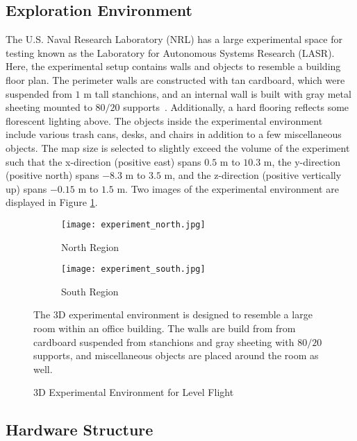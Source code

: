 \subsection{Exploration Environment}

The U.S. Naval Research Laboratory (NRL) has a large experimental space for testing known as the Laboratory for Autonomous Systems Research (LASR). Here, the experimental setup contains walls and objects to resemble a building floor plan. The perimeter walls are constructed with tan cardboard, which were suspended from $1$ m tall stanchions, and an internal wall is built with gray metal sheeting mounted to $80/20$ supports~\cite{url_8020}. Additionally, a hard flooring reflects some florescent lighting above. The objects inside the experimental environment include various trash cans, desks, and chairs in addition to a few miscellaneous objects. The map size is selected to slightly exceed the volume of the experiment such that the x-direction (positive east) spans $0.5$ m to $10.3$ m, the y-direction (positive north) spans $-8.3$ m to $3.5$ m, and the z-direction (positive vertically up) spans $-0.15$ m to $1.5$ m. Two images of the experimental environment are displayed in Figure \ref{fig:exp3DEnvironment}.

\begin{figure}[!t]
\centering
    	\begin{subfigure}[t]{0.95\columnwidth}
           	\centering
          	\texttt{[image: experiment\_north.jpg]}
        		\caption{North Region}
    	\end{subfigure}
    	\begin{subfigure}[t]{0.95\columnwidth}
	\vspace*{0.03\columnwidth}
           	\centering
          	\texttt{[image: experiment\_south.jpg]}
        		\caption{South Region}
    	\end{subfigure}
	\caption{3D Experimental Environment for Level Flight}
	\medskip
	\small
	The 3D experimental environment is designed to resemble a large room within an office building. The walls are build from from cardboard suspended from stanchions and gray sheeting with $80/20$ supports, and miscellaneous objects are placed around the room as well.
	\label{fig:exp3DEnvironment}
\end{figure}


\subsection{Hardware Structure}

